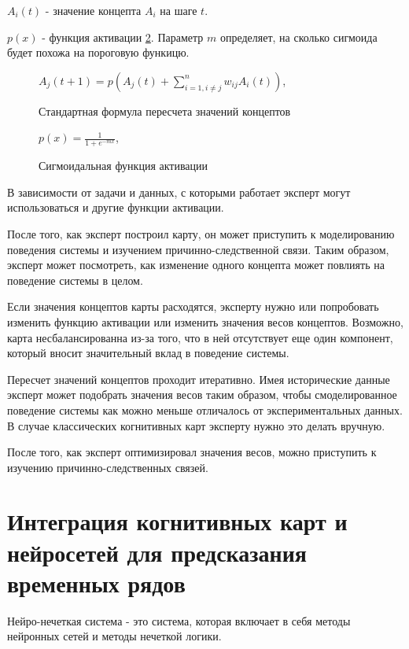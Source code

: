 $ A_i(t) $ - значение концепта $A_i$ на шаге $t$.

$ p(x) $ - функция активации \ref{img:sigmiog_actiovation}. Параметр $m$ определяет, на сколько сигмоида будет похожа на пороговую функицю.

\def\figurename{Формула}
\begin{figure}[t]
	\centering
	$ A_j(t+1) = p( A_j(t) + \sum_{i = 1, i \neq j}^{n} w_{ij} A_i(t) ) $,
	\caption{Стандартная формула пересчета значений концептов}
	\label{img:concepts_recalc}
\end{figure}
\noindent

\begin{figure}[t]
	\centering
	$ p(x) = \frac {1} {1+ e^{-mx} } $,
	\caption{Сигмоидальная функция активации}
	\label{img:sigmiog_actiovation}
\end{figure}
\def\figurename{Рис.}

В зависимости от задачи и данных, с которыми работает эксперт могут использоваться и другие
функции активации.

После того, как эксперт построил карту, он может приступить к моделированию поведения
системы и изучением причинно-следственной связи. Таким образом, эксперт может посмотреть,
как изменение одного концепта может повлиять на поведение системы в целом.

Если значения концептов карты расходятся, эксперту нужно или попробовать изменить функцию
активации или изменить значения весов концептов. Возможно, карта несбалансированна из-за
того, что в ней отсутствует еще один компонент, который вносит значительный вклад в поведение системы.

Пересчет значений концептов проходит итеративно. Имея исторические данные эксперт может
подобрать значения весов таким образом, чтобы смоделированное поведение системы как можно меньше отличалось
от экспериментальных данных. В случае классических когнитивных карт эксперту нужно это делать вручную.

После того, как эксперт оптимизировал значения весов, можно приступить к изучению причинно-следственных
связей.

\section{Интеграция когнитивных карт и нейросетей для предсказания временных рядов}

Нейро-нечеткая система - это система, которая включает в себя методы нейронных сетей и методы нечеткой логики.

